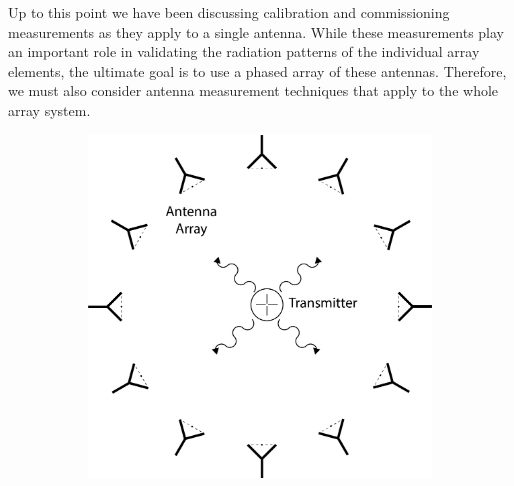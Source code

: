 Up to this point we have been discussing calibration and commissioning measurements as they apply to a single antenna. While these measurements play an important role in validating the radiation patterns of the individual array elements, the ultimate goal is to use a phased array of these antennas. Therefore, we must also consider antenna measurement techniques that apply to the whole array system.
\begin{figure}[htbp]
    \centering
    \begin{subfigure}[b]{0.4\textwidth}
        \centering
        \includegraphics[width=1\textwidth]{figs/Chapter-5/230409_beamform_array_meas.png}
        \caption{\label{fig:beam-array-meas}}
    \end{subfigure}
    \hfill
    \begin{subfigure}[b]{0.4\textwidth}
        \centering

\end{subfigure}
\end{figure}
